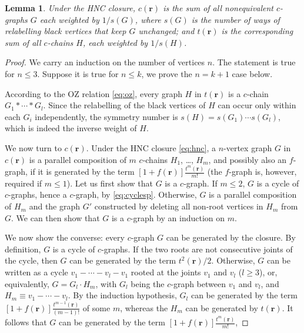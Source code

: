 \documentclass[aip,jcp,reprint,superscriptaddress]{revtex4-1}
\newtheorem{lemm}[thrm]{Lemma}
\newcommand{\vct}[1]{\mathbf{#1}}
\providecommand{\vr}{} %
\renewcommand{\vr}{\vct{r}}
\begin{document}
\begin{lemm}
Under the HNC closure,
%
$c(\vr)$
  is the sum of all nonequivalent $c$-graphs $G$
  each weighted by $1/s(G)$,
  where $s(G)$ is the number of ways of relabelling
  \emph{black} vertices that keep $G$ unchanged;
%
and $t(\vr)$ is the corresponding sum of all
  $c$-chains $H$, each weighted by $1/s(H)$.
\end{lemm}
%
\begin{proof}
%
We carry an induction on the number of vertices $n$.
%
The statement is true for $n \le 3$.
%
Suppose it is true for $n \le k$,
  we prove the $n = k + 1$ case below.

According to the OZ relation \eqref{eq:oz},
  every graph $H$ in $t(\vr)$ is
  a $c$-chain $G_1 * \cdots * G_l$.
%
Since the relabelling of the black vertices of $H$
  can occur only within each $G_i$ independently,
  the symmetry number is
  $s(H) = s(G_1) \cdots s(G_l)$,
  which is indeed the inverse weight of $H$.

We now turn to $c(\vr)$.
%
Under the HNC closure \eqref{eq:hnc},
  a $n$-vertex graph $G$ in $c(\vr)$ is
  a parallel composition of
  $m$ $c$-chains $H_1$, \dots, $H_m$,
  and possibly also an $f$-graph,
  if it is generated by the term
  $[1 + f(\vr)] \frac{ t^m(\vr) }{ m!}$
%
(the $f$-graph is, however, required if $m \le 1$).
%
Let us first show that $G$ is a $c$-graph.
%
If $m \le 2$,
  $G$ is a cycle of $c$-graphs,
  hence a $c$-graph,
  by \eqref{eq:cyclesp}.
%
Otherwise,
  $G$ is a parallel composition of $H_m$
  and the graph $G'$ constructed
  by deleting all non-root vertices in $H_m$ from $G$.
%
We can then show that $G$ is a $c$-graph by an induction on $m$.



We now show the converse:
  every $c$-graph $G$ can be generated by the closure.
%
By definition, $G$ is a cycle of $c$-graphs.
%
If the two roots are not consecutive joints of the cycle,
  then $G$ can be generated by the term $t^2(\vr)/2$.
%
Otherwise, $G$ can be written as a cycle
  $v_1 - \cdots - v_l - v_1$
  rooted at the joints $v_1$ and $v_l$
  ($l \ge 3$),
%
or, equivalently, $G = G_l \cdot H_m$,
  with
    $G_l$ being the $c$-graph between $v_1$ and $v_l$,
  and
    $H_m \equiv v_1 - \cdots - v_l$.
%
By the induction hypothesis,
  $G_l$ can be generated by the term
  $[1+f(\vr)] \frac{ t^{m - 1}(\vr) }{ (m - 1)! }$
  of some $m$,
whereas
  the $H_m$ can be generated by $t(\vr)$.
%
It follows that
  $G$ can be generated by the term
  $[1 + f(\vr)] \frac{ t^{m}(\vr) }{ m! } $,
%




\end{proof}
\end{document}
